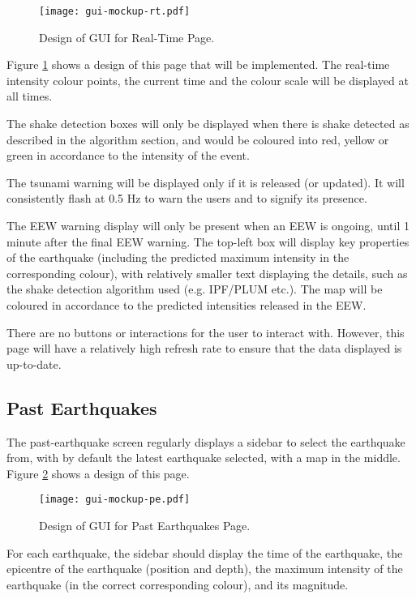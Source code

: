 \begin{figure}[htp]
    \centering
    \texttt{[image: gui-mockup-rt.pdf]}
    \caption{Design of GUI for Real-Time Page.}
    \label{fig:gui-mockup-rt}
\end{figure}

Figure \ref{fig:gui-mockup-rt} shows a design of this page that will be implemented. The real-time intensity colour points, the current time and the colour scale will be displayed at all times.

The shake detection boxes will only be displayed when there is shake detected as described in the algorithm section, and would be coloured into red, yellow or green in accordance to the intensity of the event.

The tsunami warning will be displayed only if it is released (or updated). It will consistently flash at 0.5 Hz to warn the users and to signify its presence.

The EEW warning display will only be present when an EEW is ongoing, until 1 minute after the final EEW warning. The top-left box will display key properties of the earthquake (including the predicted maximum intensity in the corresponding colour), with relatively smaller text displaying the details, such as the shake detection algorithm used (e.g. IPF/PLUM etc.). The map will be coloured in accordance to the predicted intensities released in the EEW.

There are no buttons or interactions for the user to interact with. However, this page will have a relatively high refresh rate to ensure that the data displayed is up-to-date.

\subsection{Past Earthquakes}

The past-earthquake screen regularly displays a sidebar to select the earthquake from, with by default the latest earthquake selected, with a map in the middle. Figure \ref{fig:gui-mockup-pe} shows a design of this page.

\begin{figure}[htp]
    \centering
    \texttt{[image: gui-mockup-pe.pdf]}
    \caption{Design of GUI for Past Earthquakes Page.}
    \label{fig:gui-mockup-pe}
\end{figure}

For each earthquake, the sidebar should display the time of the earthquake, the epicentre of the earthquake (position and depth), the maximum intensity of the earthquake (in the correct corresponding colour), and its magnitude.

